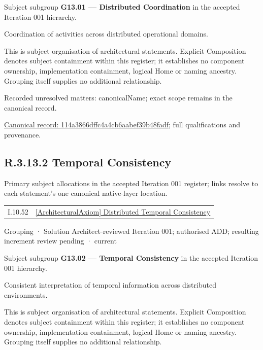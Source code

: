 Subject subgroup \textbf{G13.01 — Distributed Coordination} in the accepted Iteration 001 hierarchy.



Coordination of activities across distributed operational domains.



This is subject organisation of architectural statements. Explicit Composition denotes subject containment within this register; it establishes no component ownership, implementation containment, logical Home or naming ancestry. Grouping itself supplies no additional relationship.


{\small Recorded unresolved matters: canonicalName; exact scope remains in the canonical record.}\par
{\footnotesize \href{../../../../continuum/grouping/114a3866dffc4a4cb6aabef39b48fadf.md}{Canonical record: 114a3866dffc4a4cb6aabef39b48fadf}; full qualifications and provenance.}\par
\subsection*{R.3.13.2 Temporal Consistency}
\label{navigation:R.3.13.2}

Primary subject allocations in the accepted Iteration 001 register; links resolve to each statement’s one canonical native-layer location.\par
\begin{longtable}{p{.22\linewidth}p{.73\linewidth}}
I.10.52 & \hyperref[element:ed3e8d7923d14f8cbc6f08d3673248f2]{[ArchitecturalAxiom] Distributed Temporal Consistency} \\
\end{longtable}
\label{element:0f1014c80b0a473abf8c37845e0ed2fa}
{\small Grouping · Solution Architect-reviewed Iteration 001; authorised ADD; resulting increment review pending · current}\par

Subject subgroup \textbf{G13.02 — Temporal Consistency} in the accepted Iteration 001 hierarchy.



Consistent interpretation of temporal information across distributed environments.



This is subject organisation of architectural statements. Explicit Composition denotes subject containment within this register; it establishes no component ownership, implementation containment, logical Home or naming ancestry. Grouping itself supplies no additional relationship.


